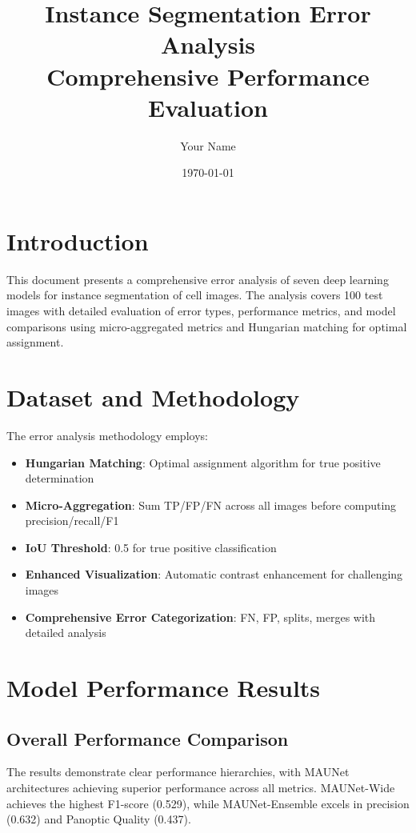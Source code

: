 \documentclass[11pt,a4paper]{article}
\title{Instance Segmentation Error Analysis\\Comprehensive Performance Evaluation}
\author{Your Name}
\date{\today}
\begin{document}
\maketitle

\section{Introduction}
This document presents a comprehensive error analysis of seven deep learning models for instance segmentation of cell images. The analysis covers 100 test images with detailed evaluation of error types, performance metrics, and model comparisons using micro-aggregated metrics and Hungarian matching for optimal assignment.

\section{Dataset and Methodology}


The error analysis methodology employs:
\begin{itemize}
\item \textbf{Hungarian Matching}: Optimal assignment algorithm for true positive determination
\item \textbf{Micro-Aggregation}: Sum TP/FP/FN across all images before computing precision/recall/F1
\item \textbf{IoU Threshold}: 0.5 for true positive classification
\item \textbf{Enhanced Visualization}: Automatic contrast enhancement for challenging images
\item \textbf{Comprehensive Error Categorization}: FN, FP, splits, merges with detailed analysis
\end{itemize}

\section{Model Performance Results}

\subsection{Overall Performance Comparison}




The results demonstrate clear performance hierarchies, with MAUNet architectures achieving superior performance across all metrics. MAUNet-Wide achieves the highest F1-score (0.529), while MAUNet-Ensemble excels in precision (0.632) and Panoptic Quality (0.437).
\end{document}

